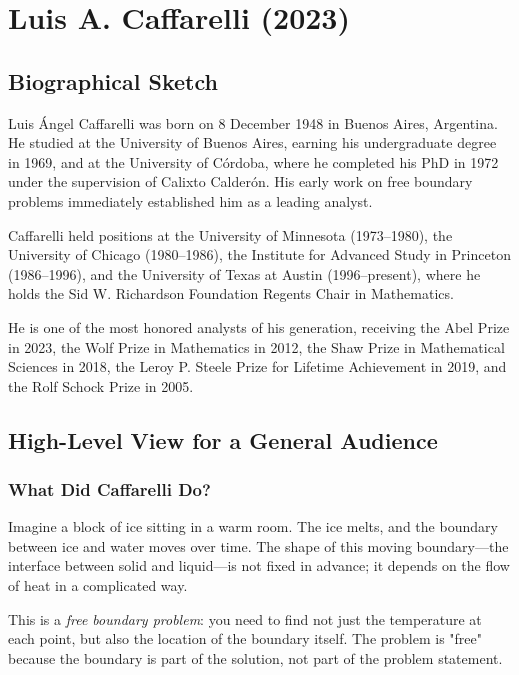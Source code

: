 \chapter{Luis A. Caffarelli (2023)}

\section{Biographical Sketch}



Luis \'Angel Caffarelli was born on 8 December 1948 in Buenos Aires, Argentina. He studied at the University of Buenos Aires, earning his undergraduate degree in 1969, and at the University of C\'ordoba, where he completed his PhD in 1972 under the supervision of Calixto Calder\'on. His early work on free boundary problems immediately established him as a leading analyst.

Caffarelli held positions at the University of Minnesota (1973--1980), the University of Chicago (1980--1986), the Institute for Advanced Study in Princeton (1986--1996), and the University of Texas at Austin (1996--present), where he holds the Sid W. Richardson Foundation Regents Chair in Mathematics.

He is one of the most honored analysts of his generation, receiving the Abel Prize in 2023, the Wolf Prize in Mathematics in 2012, the Shaw Prize in Mathematical Sciences in 2018, the Leroy P. Steele Prize for Lifetime Achievement in 2019, and the Rolf Schock Prize in 2005.

\section{High-Level View for a General Audience}

\subsection{What Did Caffarelli Do?}

Imagine a block of ice sitting in a warm room. The ice melts, and the boundary between ice and water moves over time. The shape of this moving boundary---the interface between solid and liquid---is not fixed in advance; it depends on the flow of heat in a complicated way.

This is a \emph{free boundary problem}: you need to find not just the temperature at each point, but also the location of the boundary itself. The problem is "free" because the boundary is part of the solution, not part of the problem statement.

